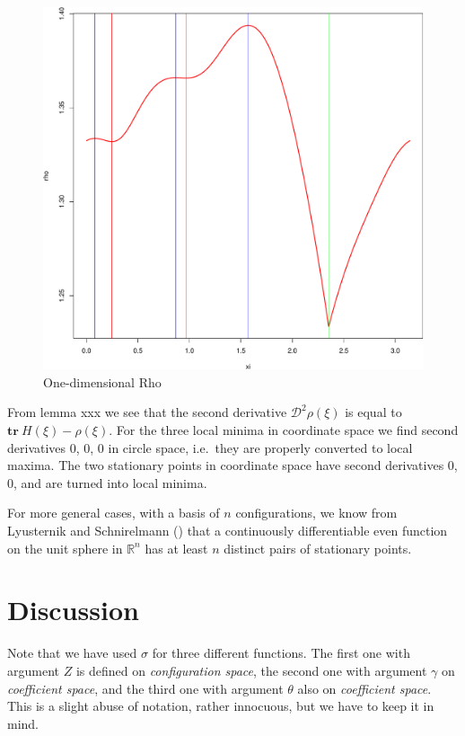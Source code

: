 \documentclass[
  12pt,
  letterpaper,
  DIV=11,
  numbers=noendperiod]{scrreprt}
\theoremstyle{remark}
\begin{document}
\begin{figure}[H]

{\centering \includegraphics{spaces_files/figure-pdf/rhononlinearplot-1.pdf}

}

\caption{One-dimensional Rho}

\end{figure}%

From lemma xxx we see that the second derivative
\(\mathcal{D}^2\rho(\xi)\) is equal to
\(\mathbf{tr}\ H(\xi)-\rho(\xi)\). For the three local minima in
coordinate space we find second derivatives 0, 0, 0 in circle space,
i.e.~they are properly converted to local maxima. The two stationary
points in coordinate space have second derivatives 0, 0, and are turned
into local minima.

For more general cases, with a basis of \(n\) configurations, we know
from Lyusternik and Schnirelmann
() that a continuously
differentiable even function on the unit sphere in \(\mathbb{R}^n\) has
at least \(n\) distinct pairs of stationary points.

\section{Discussion}\label{discussion}

Note that we have used \(\sigma\) for three different functions. The
first one with argument \(Z\) is defined on \emph{configuration space},
the second one with argument \(\gamma\) on \emph{coefficient space}, and
the third one with argument \(\theta\) also on \emph{coefficient space}.
This is a slight abuse of notation, rather innocuous, but we have to
keep it in mind.
\end{document}
